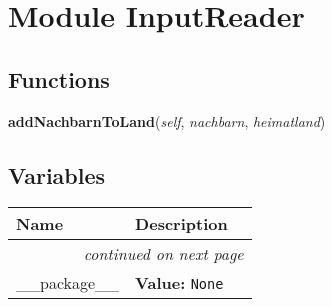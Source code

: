 %
%
%


\section{Module InputReader}

    \label{InputReader}


  \subsection{Functions}

    \label{InputReader:addNachbarnToLand}

    \vspace{0.5ex}

\hspace{.8\funcindent}\begin{boxedminipage}{\funcwidth}

    \raggedright \textbf{addNachbarnToLand}(\textit{self}, \textit{nachbarn}, \textit{heimatland})

\setlength{\parskip}{2ex}
\setlength{\parskip}{1ex}
    \end{boxedminipage}



  \subsection{Variables}

    \vspace{-1cm}
\hspace{\varindent}\begin{longtable}{|p{\varnamewidth}|p{\vardescrwidth}|l}
\cline{1-2}
\cline{1-2} \centering \textbf{Name} & \centering \textbf{Description}& \\
\cline{1-2}
\endhead\cline{1-2}\multicolumn{3}{r}{\small\textit{continued on next page}}\\\endfoot\cline{1-2}
\endlastfoot\raggedright \_\-\_\-p\-a\-c\-k\-a\-g\-e\-\_\-\_\- & \raggedright \textbf{Value:} 
{\tt None}&\\
\cline{1-2}
\end{longtable}


